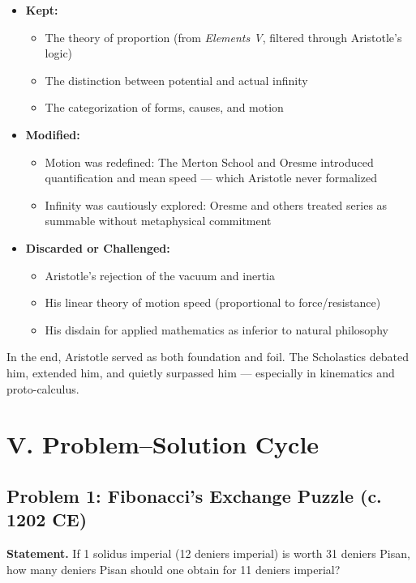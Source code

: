 \documentclass[9pt]{article}
\begin{document}
\begin{itemize}
    \item \textbf{Kept:}
    \begin{itemize}
        \item The theory of proportion (from \textit{Elements V}, filtered through Aristotle’s logic)
        \item The distinction between potential and actual infinity
        \item The categorization of forms, causes, and motion
    \end{itemize}
    \item \textbf{Modified:}
    \begin{itemize}
        \item Motion was redefined: The Merton School and Oresme introduced quantification and mean speed — which Aristotle never formalized
        \item Infinity was cautiously explored: Oresme and others treated series as summable without metaphysical commitment
    \end{itemize}
    \item \textbf{Discarded or Challenged:}
    \begin{itemize}
        \item Aristotle’s rejection of the vacuum and inertia
        \item His linear theory of motion speed (proportional to force/resistance)
        \item His disdain for applied mathematics as inferior to natural philosophy
    \end{itemize}
\end{itemize}

In the end, Aristotle served as both foundation and foil. The Scholastics debated him, extended him, and quietly surpassed him — especially in kinematics and proto-calculus.



\newpage

\section*{V. Problem–Solution Cycle}

\subsection*{Problem 1: Fibonacci’s Exchange Puzzle (c. 1202 CE)}

\textbf{Statement.} If 1 solidus imperial (12 deniers imperial) is worth 31 deniers Pisan, how many deniers Pisan should one obtain for 11 deniers imperial?
\end{document}
